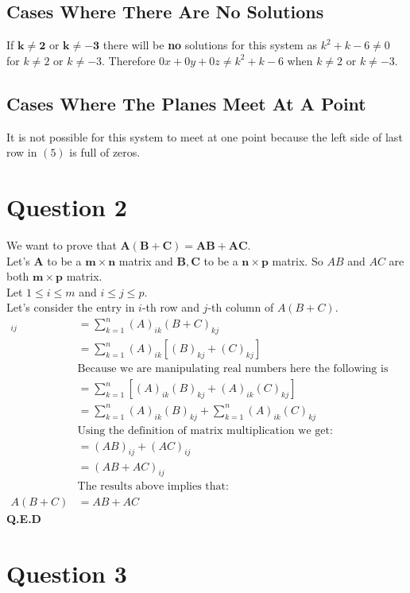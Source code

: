 \documentclass[12pt]{article}
\begin{document}
\subsection{Cases Where There Are No Solutions}
If $\bm{k \neq 2}$ or $\bm{k \neq -3}$ there will be {\bf no} solutions for this system as $k^2+k-6 \neq 0$ for $k \neq 2$ or $k \neq -3$. Therefore $0x + 0y + 0z \neq k^2+k-6$ when $k \neq 2$ or $k \neq -3$.

\subsection{Cases Where The Planes Meet At A Point}
It is not possible for this system to meet at one point because the left side of last row in $(5)$ is full of zeros. 

\newpage

\section{Question 2}
We want to prove that $\bm{A(B+C)=AB+AC}$.\\
Let's $\bm{A}$ to be a $\bm{m \times n}$ matrix and $\bm{B,C}$ to be a  $\bm{n \times p}$ matrix.
So $AB$ and $AC$ are both $\bm{m \times p}$ matrix. \\
Let $1 \leq i \leq m$ and $i \leq j \leq p$.\\
Let's consider the entry in $i$-th row and $j$-th column of $A(B+C)$.
\begin{align*}
[A(B+C)]_{ij}&=\sum^n_{k=1}(A)_{ik}(B+C)_{kj}\\
&=\sum^n_{k=1}(A)_{ik}\left[(B)_{kj}+(C)_{kj}\right]\\
&\text{Because we are manipulating real numbers here the following is allowed:}\\
&=\sum^n_{k=1}\left[(A)_{ik}(B)_{kj}+(A)_{ik}(C)_{kj}\right]\\
&=\sum^n_{k=1}(A)_{ik}(B)_{kj}+\sum^n_{k=1}(A)_{ik}(C)_{kj}\\
&\text{Using the definition of matrix multiplication we get:}\\
&=(AB)_{ij}+(AC)_{ij}\\
&=(AB+AC)_{ij}\\
&\text{The results above implies that:}\\
A(B+C)&=AB+AC
\end{align*}
{\bf Q.E.D}
\newpage

\section{Question 3}
\end{document}
